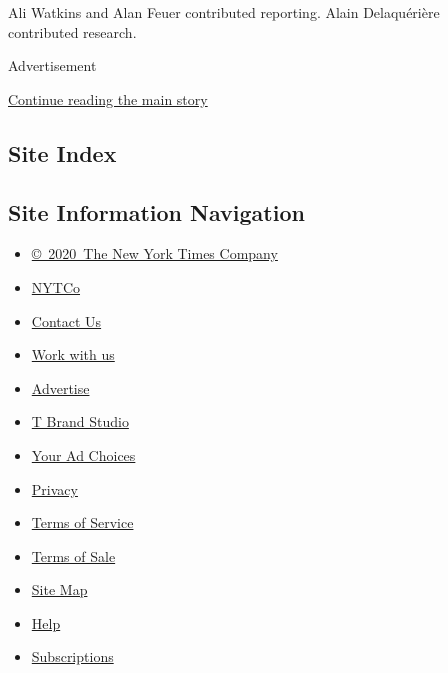 Ali Watkins and Alan Feuer contributed reporting. Alain Delaquérière
contributed research.

Advertisement

\protect\hyperlink{after-bottom}{Continue reading the main story}

\hypertarget{site-index}{%
\subsection{Site Index}\label{site-index}}

\hypertarget{site-information-navigation}{%
\subsection{Site Information
Navigation}\label{site-information-navigation}}

\begin{itemize}
\tightlist
\item
  \href{https://help.nytimes3xbfgragh.onion/hc/en-us/articles/115014792127-Copyright-notice}{©~2020~The
  New York Times Company}
\end{itemize}

\begin{itemize}
\tightlist
\item
  \href{https://www.nytco.com/}{NYTCo}
\item
  \href{https://help.nytimes3xbfgragh.onion/hc/en-us/articles/115015385887-Contact-Us}{Contact
  Us}
\item
  \href{https://www.nytco.com/careers/}{Work with us}
\item
  \href{https://nytmediakit.com/}{Advertise}
\item
  \href{http://www.tbrandstudio.com/}{T Brand Studio}
\item
  \href{https://www.nytimes3xbfgragh.onion/privacy/cookie-policy\#how-do-i-manage-trackers}{Your
  Ad Choices}
\item
  \href{https://www.nytimes3xbfgragh.onion/privacy}{Privacy}
\item
  \href{https://help.nytimes3xbfgragh.onion/hc/en-us/articles/115014893428-Terms-of-service}{Terms
  of Service}
\item
  \href{https://help.nytimes3xbfgragh.onion/hc/en-us/articles/115014893968-Terms-of-sale}{Terms
  of Sale}
\item
  \href{https://spiderbites.nytimes3xbfgragh.onion}{Site Map}
\item
  \href{https://help.nytimes3xbfgragh.onion/hc/en-us}{Help}
\item
  \href{https://www.nytimes3xbfgragh.onion/subscription?campaignId=37WXW}{Subscriptions}
\end{itemize}
